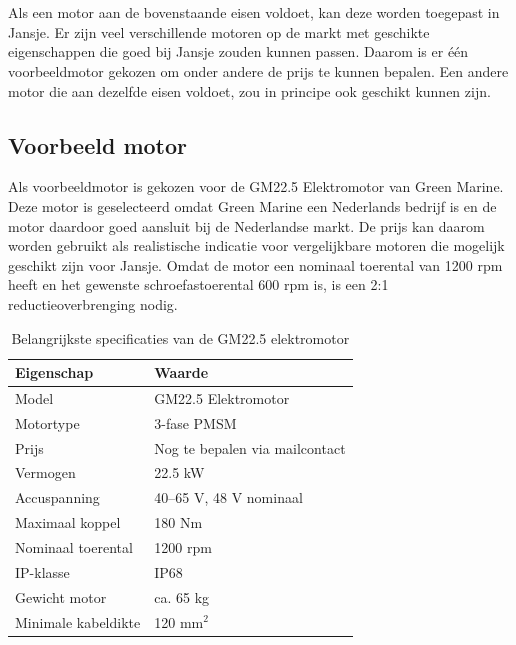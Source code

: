 \noindent 

\section{}
Als een motor aan de bovenstaande eisen voldoet, kan deze worden toegepast in Jansje. Er zijn veel verschillende motoren op de markt met geschikte eigenschappen die goed bij Jansje zouden kunnen passen. Daarom is er één voorbeeldmotor gekozen om onder andere de prijs te kunnen bepalen. Een andere motor die aan dezelfde eisen voldoet, zou in principe ook geschikt kunnen zijn.


\subsection{Voorbeeld motor}
Als voorbeeldmotor is gekozen voor de GM22.5 Elektromotor van Green Marine. Deze motor is geselecteerd omdat Green Marine een Nederlands bedrijf is en de motor daardoor goed aansluit bij de Nederlandse markt. De prijs kan daarom worden gebruikt als realistische indicatie voor vergelijkbare motoren die mogelijk geschikt zijn voor Jansje. Omdat de motor een nominaal toerental van 1200 rpm heeft en het gewenste schroefastoerental 600 rpm is, is een 2:1 reductieoverbrenging nodig.

\begin{table}[h]
    \centering
    \caption{Belangrijkste specificaties van de GM22.5 elektromotor}
    \label{tab:gm22-5-motor}
    \begin{tabular}{ll}
        \hline
        \textbf{Eigenschap} & \textbf{Waarde\cite{greenmarine_gm225_datasheet}} \\
        \hline
        Model & GM22.5 Elektromotor \\
        Motortype & 3-fase PMSM \\
        Prijs & Nog te bepalen via mailcontact \\
        Vermogen & 22.5 kW \\
        Accuspanning & 40--65 V, 48 V nominaal \\
        Maximaal koppel & 180 Nm \\
        Nominaal toerental & 1200 rpm \\
        IP-klasse & IP68 \\
        Gewicht motor & ca. 65 kg \\
        Minimale kabeldikte & 120 mm$^2$ \\
        \hline
    \end{tabular}
\end{table}
